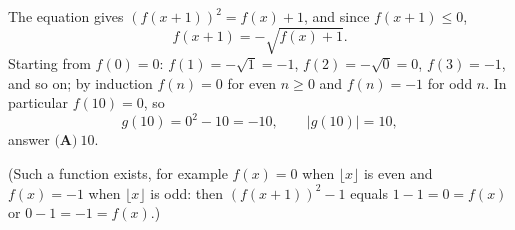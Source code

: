 The equation gives $\left(f(x+1)\right)^2=f(x)+1$, and since $f(x+1)\le0$,
\[f(x+1)=-\sqrt{f(x)+1}.\]
Starting from $f(0)=0$: $f(1)=-\sqrt1=-1$, $f(2)=-\sqrt0=0$, $f(3)=-1$, and so on; by induction $f(n)=0$ for even $n\ge0$ and $f(n)=-1$ for odd $n$. In particular $f(10)=0$, so
\[g(10)=0^2-10=-10,\qquad|g(10)|=10,\]
answer $\boxed{\textbf{(A)}\ 10}$.

(Such a function exists, for example $f(x)=0$ when $\lfloor x\rfloor$ is even and $f(x)=-1$ when $\lfloor x\rfloor$ is odd: then $\left(f(x+1)\right)^2-1$ equals $1-1=0=f(x)$ or $0-1=-1=f(x)$.)
